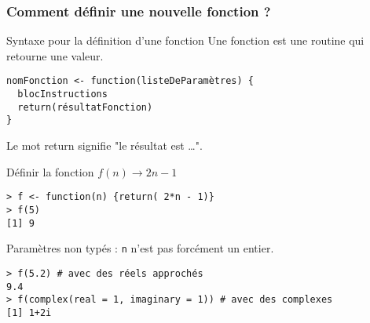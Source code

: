 \documentclass[10pt]{beamer}
\begin{document}
\begin{frame}[fragile]
  \frametitle{Comment définir une nouvelle fonction ?}

  \begin{alertblock}{Syntaxe pour la définition d'une fonction}
    Une fonction est une routine qui retourne une valeur.  
  \begin{lstlisting}[style=edblock]
nomFonction <- function(listeDeParamètres) {
  blocInstructions
  return(résultatFonction)
}
\end{lstlisting}
Le mot \alert{return} signifie "le résultat est \dots".
\end{alertblock}

\begin{exampleblock}{Définir la fonction $f(n) \rightarrow 2n - 1$}
  \begin{lstlisting}[style=block]
> f <- function(n) {return( 2*n - 1)}
> f(5)
[1] 9    
\end{lstlisting}
\end{exampleblock}
\begin{block}{Paramètres non typés : \texttt{n} n'est pas forcément un entier.}
 \begin{lstlisting}[style=block]
> f(5.2) # avec des réels approchés
9.4
> f(complex(real = 1, imaginary = 1)) # avec des complexes
[1] 1+2i
  \end{lstlisting}  
\end{block}
\end{frame}
\end{document}
